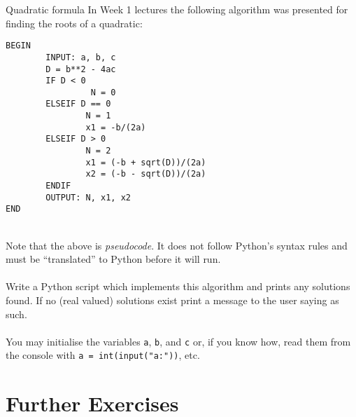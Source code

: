 \documentclass{lab}
\begin{document}
\begin{task}{Quadratic formula}{}
In Week 1 lectures the following algorithm was presented for finding the roots of a quadratic:
\begin{lstlisting}[style=pseudo]
BEGIN
        INPUT: a, b, c
        D = b**2 - 4ac
        IF D < 0
                 N = 0
        ELSEIF D == 0
                N = 1
                x1 = -b/(2a)
        ELSEIF D > 0
                N = 2
                x1 = (-b + sqrt(D))/(2a)
                x2 = (-b - sqrt(D))/(2a)
        ENDIF
        OUTPUT: N, x1, x2
END
\end{lstlisting}
~\\
Note that the above is \textit{pseudocode}. It does not follow Python's syntax rules and must be ``translated'' to Python before it will run.
\\~\\
Write a Python script which implements this algorithm and prints any solutions found. If no (real valued) solutions exist print a message to the user saying as such.
\\~\\
You may initialise the variables \texttt{a}, \texttt{b}, and \texttt{c} or, if you know how, read them from the console with \texttt{a = int(input("a:"))}, etc.
\end{task}

\pagebreak

\section{Further Exercises}
\end{document}
